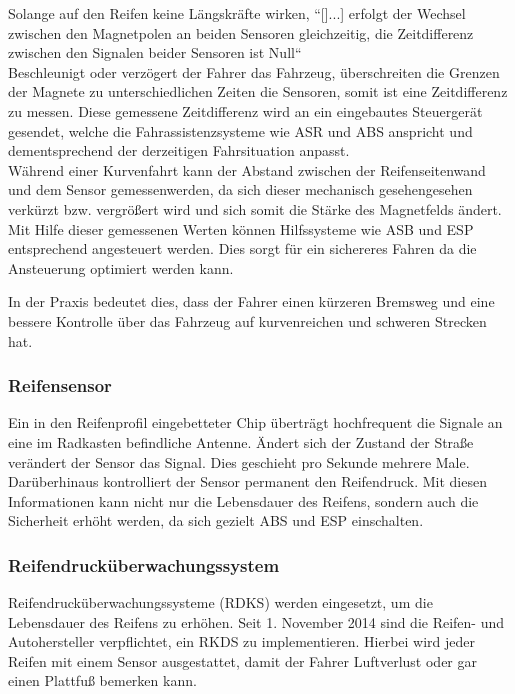 \begin{flushleft}
	                Solange auf den Reifen keine Längskräfte wirken, ``[]...] erfolgt der Wechsel zwischen den Magnetpolen an beiden Sensoren gleichzeitig, die Zeitdifferenz zwischen den Signalen beider Sensoren ist Null`` \cite{TS_swt} \\	
	                Beschleunigt oder verzögert der Fahrer das Fahrzeug, überschreiten die Grenzen der Magnete zu unterschiedlichen Zeiten die Sensoren, somit ist eine Zeitdifferenz zu messen. 
	                Diese gemessene Zeitdifferenz wird an ein eingebautes Steuergerät gesendet, welche die Fahrassistenzsysteme wie ASR und ABS anspricht und dementsprechend der derzeitigen Fahrsituation anpasst.\\
	                
					Während einer Kurvenfahrt kann der Abstand zwischen der Reifenseitenwand und dem Sensor gemessenwerden, da sich dieser mechanisch gesehengesehen verkürzt bzw. vergrößert wird und sich somit die Stärke des Magnetfelds ändert.\\
	                Mit Hilfe dieser gemessenen Werten können Hilfssysteme wie ASB und ESP entsprechend angesteuert werden. Dies sorgt für ein sichereres Fahren da die Ansteuerung optimiert werden kann. 
	                
	                In der Praxis bedeutet dies, dass der Fahrer einen kürzeren Bremsweg und eine bessere Kontrolle über das Fahrzeug auf kurvenreichen und schweren Strecken hat.
	
	                \subsubsection{Reifensensor}
	
	                Ein in den Reifenprofil eingebetteter Chip überträgt hochfrequent die Signale an eine im Radkasten befindliche Antenne. 
	                Ändert sich der Zustand der Straße verändert der Sensor das Signal. Dies geschieht pro Sekunde mehrere Male. 
	                Darüberhinaus kontrolliert der Sensor permanent den Reifendruck. Mit diesen Informationen kann nicht nur die Lebensdauer des Reifens, sondern auch die Sicherheit erhöht werden, 
	                da sich gezielt ABS und ESP einschalten.\\ 
				
	                \subsubsection{Reifendrucküberwachungssystem}
	                Reifendrucküberwachungssysteme (RDKS) werden eingesetzt, um die Lebensdauer des Reifens zu erhöhen. Seit 1. November 2014 sind die Reifen- und Autohersteller verpflichtet, ein RKDS zu implementieren.
	                Hierbei wird jeder Reifen mit einem Sensor ausgestattet, damit der Fahrer Luftverlust oder gar einen Plattfuß bemerken kann.
	                

\end{flushleft}
